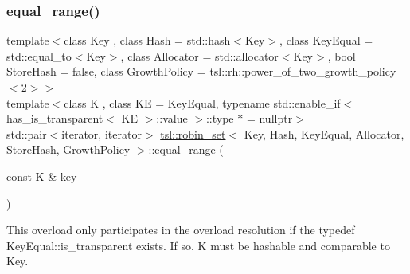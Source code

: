 \subsubsection{\texorpdfstring{equal\_range()}{equal\_range()}\hspace{0.1cm}{\footnotesize\ttfamily [3/6]}}
{\footnotesize\ttfamily template$<$class Key , class Hash  = std\+::hash$<$\+Key$>$, class Key\+Equal  = std\+::equal\+\_\+to$<$\+Key$>$, class Allocator  = std\+::allocator$<$\+Key$>$, bool Store\+Hash = false, class Growth\+Policy  = tsl\+::rh\+::power\+\_\+of\+\_\+two\+\_\+growth\+\_\+policy$<$2$>$$>$ \\
template$<$class K , class KE  = Key\+Equal, typename std\+::enable\+\_\+if$<$ has\+\_\+is\+\_\+transparent$<$ K\+E $>$\+::value $>$\+::type $\ast$  = nullptr$>$ \\
std\+::pair$<$iterator, iterator$>$ \mbox{\hyperlink{classtsl_1_1robin__set}{tsl\+::robin\+\_\+set}}$<$ Key, Hash, Key\+Equal, Allocator, Store\+Hash, Growth\+Policy $>$\+::equal\+\_\+range (\begin{DoxyParamCaption}\item[{const K \&}]{key }\end{DoxyParamCaption})\hspace{0.3cm}{\ttfamily [inline]}}

This overload only participates in the overload resolution if the typedef Key\+Equal\+::is\+\_\+transparent exists. If so, K must be hashable and comparable to Key. \mbox{\label{classtsl_1_1robin__set_aea03fafd11ec0cda987f105f191deaaf}} 
